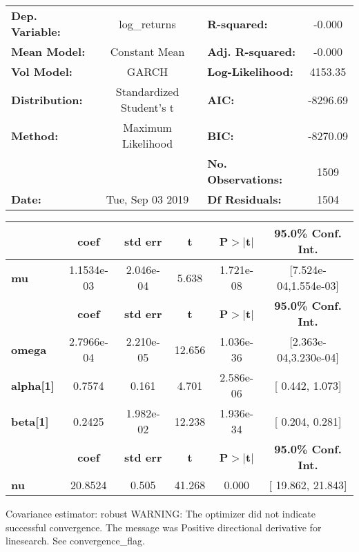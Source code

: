 \begin{center}
\begin{tabular}{lclc}
\toprule
\textbf{Dep. Variable:} &       log\_returns       & \textbf{  R-squared:         } &    -0.000   \\
\textbf{Mean Model:}    &      Constant Mean       & \textbf{  Adj. R-squared:    } &    -0.000   \\
\textbf{Vol Model:}     &          GARCH           & \textbf{  Log-Likelihood:    } &    4153.35  \\
\textbf{Distribution:}  & Standardized Student's t & \textbf{  AIC:               } &   -8296.69  \\
\textbf{Method:}        &    Maximum Likelihood    & \textbf{  BIC:               } &   -8270.09  \\
\textbf{}               &                          & \textbf{  No. Observations:  } &    1509     \\
\textbf{Date:}          &     Tue, Sep 03 2019     & \textbf{  Df Residuals:      } &    1504     \\
\bottomrule
\end{tabular}
\begin{tabular}{lccccc}
            & \textbf{coef} & \textbf{std err} & \textbf{t} & \textbf{P$> |$t$|$} & \textbf{95.0\% Conf. Int.}  \\
\midrule
\textbf{mu} &   1.1534e-03  &    2.046e-04     &     5.638  &      1.721e-08       &   [7.524e-04,1.554e-03]     \\
                  & \textbf{coef} & \textbf{std err} & \textbf{t} & \textbf{P$> |$t$|$} & \textbf{95.0\% Conf. Int.}  \\
\midrule
\textbf{omega}    &   2.7966e-04  &    2.210e-05     &    12.656  &      1.036e-36       &   [2.363e-04,3.230e-04]     \\
\textbf{alpha[1]} &       0.7574  &        0.161     &     4.701  &      2.586e-06       &     [  0.442,  1.073]       \\
\textbf{beta[1]}  &       0.2425  &    1.982e-02     &    12.238  &      1.936e-34       &     [  0.204,  0.281]       \\
            & \textbf{coef} & \textbf{std err} & \textbf{t} & \textbf{P$> |$t$|$} & \textbf{95.0\% Conf. Int.}  \\
\midrule
\textbf{nu} &      20.8524  &        0.505     &    41.268  &        0.000         &     [ 19.862, 21.843]       \\
\bottomrule
\end{tabular}
\end{center}

Covariance estimator: robust \newline
  \newline
 WARNING: The optimizer did not indicate successful convergence. The message was \newline
 Positive directional derivative for linesearch. See convergence_flag.
